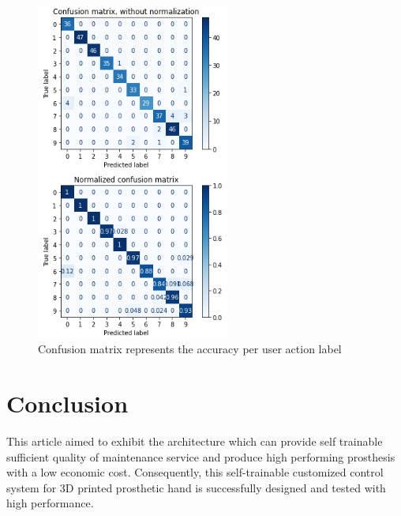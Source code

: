 \documentclass[conference]{IEEEtran}
\begin{document}
\begin{figure}[h]
  \centering
  \includegraphics[width=2.5in]{confusionmatrix3.PNG}
  \caption{Confusion matrix represents the accuracy per user action label}
  \label{cm}
\end{figure}



\section{Conclusion}
This article aimed to exhibit the architecture which can provide self trainable sufficient quality of maintenance service and produce high performing prosthesis with a low economic cost. Consequently, this self-trainable customized control system for 3D printed prosthetic hand is successfully designed and tested with high performance.








\ifCLASSOPTIONcaptionsoff
  \newpage
\fi
\end{document}
